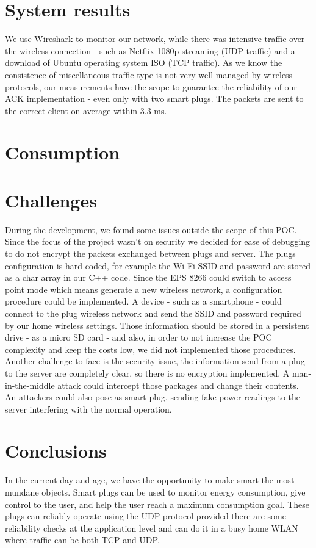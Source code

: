 \documentclass[conference]{IEEEtran}
\begin{document}
\section{System results}
We use Wireshark to monitor our network, while there was intensive traffic over the wireless connection - such as Netflix 1080p streaming (UDP traffic) and a download of Ubuntu operating system ISO (TCP traffic). As we know the consistence of miscellaneous traffic type is not very well managed by wireless protocols, our measurements have the scope to guarantee the reliability of our ACK implementation - even only with two smart plugs. The packets are sent to the correct client on average within 3.3 ms.
 \section{Consumption}

\section{Challenges}
During the development, we found some issues outside the scope of this POC. Since the focus of the project wasn't on security we decided for ease of debugging to do not encrypt the packets exchanged between plugs and server. The plugs configuration is hard-coded, for example the Wi-Fi SSID and password are stored as a char array in our C++ code. Since the EPS 8266 could switch to access point mode which means generate a new wireless network, a configuration procedure could be implemented. A device - such as a smartphone - could connect to the plug wireless network and send the SSID and password required by our home wireless settings. Those information should be stored in a persistent drive - as a micro SD card - and also, in order to not increase the POC complexity and keep the costs low, we did not implemented those procedures.
Another challenge to face is the security issue, the information send from a plug to the server are completely clear, so there is no encryption implemented. A man-in-the-middle attack could intercept those packages and change their contents. An attackers could also pose as smart plug, sending fake power readings to the server interfering with the normal operation.
\section{Conclusions}
In the current day and age, we have the opportunity to make smart the most mundane objects. Smart plugs can be used to monitor energy consumption, give control to the user, and help the user reach a maximum consumption goal. These plugs can reliably operate using the UDP protocol provided there are some reliability checks at the application level and can do it in a busy home WLAN where traffic can be both TCP and UDP.
\end{document}
